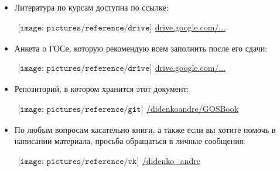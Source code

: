\begin{flushleft}
\begin{itemize}[wide, labelwidth=!, labelindent=0pt, label=$\blacktriangleright$, noitemsep]
\item Литература по курсам доступна по ссылке:

\qquad\href{https://drive.google.com/drive/u/0/folders/0BzuzEyNkpwYDcENXcV9jNWdwVlU}{$
\begin{array}{l}
\texttt{[image: pictures/reference/drive]}
\end{array}
$\large drive.google.com/...}

\item Анкета о ГОСе, которую рекомендую всем заполнить после его сдачи:

\qquad\href{https://docs.google.com/spreadsheets/d/1l2de9_qlCLvvqJIK8ZY6rtk_TJQbvo8cWd5o7uVtl2M/edit\#gid=0}{$
\begin{array}{l}
\texttt{[image: pictures/reference/drive]}
\end{array}
$\large drive.google.com/...}

\iffalse
\item Подпишитесь на наш Telegram-бот с помощью команды \textsf{/subscribe}, и вы будете получать свежую версию автоматически!

\qquad\href{https://t.me/gosbook_bot}{$
\begin{array}{l}
\texttt{[image: pictures/reference/telegram]}
\end{array}
$\large /GOSBook\_Bot} 
\fi

\item Репозиторий, в котором хранится этот документ:

\qquad\href{https://github.com/DidenkoAndre/GOSBook}{$
\begin{array}{l}
\texttt{[image: pictures/reference/git]}
\end{array}
$\large /didenkoandre/GOSBook}

\iffalse
\item Вы всегда можете поддержать проект материально! 
Перевести средства на развитие проекта можно на карту {\large 5244 6873 8510 3816} \textsf{(MasterCard)}.
\fi

\item По любым вопросам касательно книги, а также если вы хотите помочь в написании материала, просьба обращаться в личные сообщения: 

\qquad\href{https://vk.com/didenko_andre}{$
\begin{array}{l}
\texttt{[image: pictures/reference/vk]}
\end{array}
$\large /didenko\_\!andre}


\end{itemize}
\end{flushleft}
